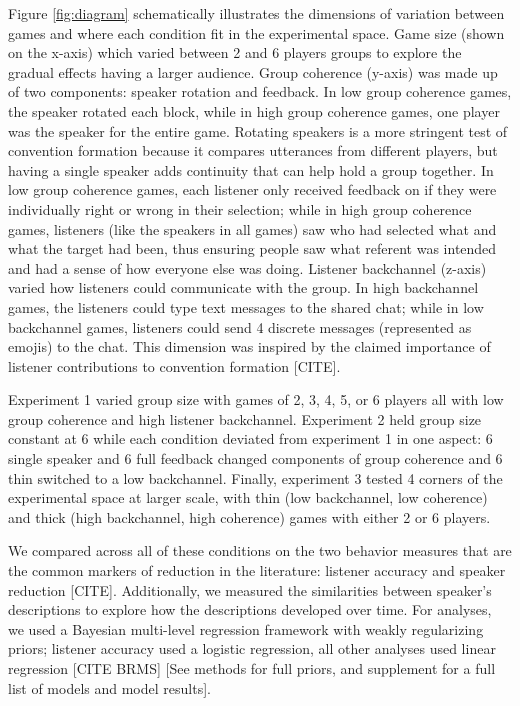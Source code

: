 \documentclass[
  english,
  a4paper,
]{article}
\begin{document}
Figure \ref{fig:diagram} schematically illustrates the dimensions of variation between games and where each condition fit in the experimental space. Game size (shown on the x-axis) which varied between 2 and 6 players groups to explore the gradual effects having a larger audience. Group coherence (y-axis) was made up of two components: speaker rotation and feedback. In low group coherence games, the speaker rotated each block, while in high group coherence games, one player was the speaker for the entire game. Rotating speakers is a more stringent test of convention formation because it compares utterances from different players, but having a single speaker adds continuity that can help hold a group together. In low group coherence games, each listener only received feedback on if they were individually right or wrong in their selection; while in high group coherence games, listeners (like the speakers in all games) saw who had selected what and what the target had been, thus ensuring people saw what referent was intended and had a sense of how everyone else was doing. Listener backchannel (z-axis) varied how listeners could communicate with the group. In high backchannel games, the listeners could type text messages to the shared chat; while in low backchannel games, listeners could send 4 discrete messages (represented as emojis) to the chat. This dimension was inspired by the claimed importance of listener contributions to convention formation {[}CITE{]}.

Experiment 1 varied group size with games of 2, 3, 4, 5, or 6 players all with low group coherence and high listener backchannel. Experiment 2 held group size constant at 6 while each condition deviated from experiment 1 in one aspect: 6 single speaker and 6 full feedback changed components of group coherence and 6 thin switched to a low backchannel. Finally, experiment 3 tested 4 corners of the experimental space at larger scale, with thin (low backchannel, low coherence) and thick (high backchannel, high coherence) games with either 2 or 6 players.

We compared across all of these conditions on the two behavior measures that are the common markers of reduction in the literature: listener accuracy and speaker reduction {[}CITE{]}. Additionally, we measured the similarities between speaker's descriptions to explore how the descriptions developed over time. For analyses, we used a Bayesian multi-level regression framework with weakly regularizing priors; listener accuracy used a logistic regression, all other analyses used linear regression {[}CITE BRMS{]} {[}See methods for full priors, and supplement for a full list of models and model results{]}.
\end{document}
